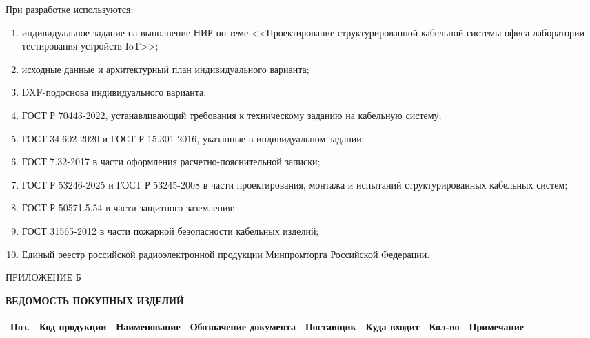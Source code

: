 \documentclass{bmstu}
\begin{document}
\begin{appendices}
При разработке используются:

\begin{enumerate}[label=\asbuk*)]
    \item индивидуальное задание на выполнение НИР по теме <<Проектирование структурированной кабельной системы офиса лаборатории тестирования устройств IoT>>;
    \item исходные данные и архитектурный план индивидуального варианта;
    \item DXF-подоснова индивидуального варианта;
    \item ГОСТ Р 70443-2022, устанавливающий требования к техническому заданию на кабельную систему;
    \item ГОСТ 34.602-2020 и ГОСТ Р 15.301-2016, указанные в индивидуальном задании;
    \item ГОСТ 7.32-2017 в части оформления расчетно-пояснительной записки;
    \item ГОСТ Р 53246-2025 и ГОСТ Р 53245-2008 в части проектирования, монтажа и испытаний структурированных кабельных систем;
    \item ГОСТ Р 50571.5.54 в части защитного заземления;
    \item ГОСТ 31565-2012 в части пожарной безопасности кабельных изделий;
    \item Единый реестр российской радиоэлектронной продукции Минпромторга Российской Федерации.
\end{enumerate}

\vspace{1em}
\cleardoublepage
{}
{}
\renewcommand{\thesection}{\thechapter.\arabic{section}}

\begin{flushright}
ПРИЛОЖЕНИЕ Б
\end{flushright}

\begin{center}
\textbf{\large ВЕДОМОСТЬ ПОКУПНЫХ ИЗДЕЛИЙ}
\end{center}

\begin{landscape}
\begin{small}
\begin{longtable}{|p{0.8cm}|p{2.5cm}|p{6.2cm}|p{2.3cm}|p{2.3cm}|p{3.2cm}|p{1.2cm}|p{3.0cm}|}
\hline
\centering \textbf{Поз.} &
\centering \textbf{Код продукции} &
\centering \textbf{Наименование} &
\centering \textbf{Обозначение документа} &
\centering \textbf{Поставщик} &
\centering \textbf{Куда входит} &
\centering \textbf{Кол-во} &
\centering \textbf{Примечание} \tabularnewline
\hline
\endfirsthead


\end{longtable}
\end{small}
\end{landscape}
\end{appendices}
\end{document}
